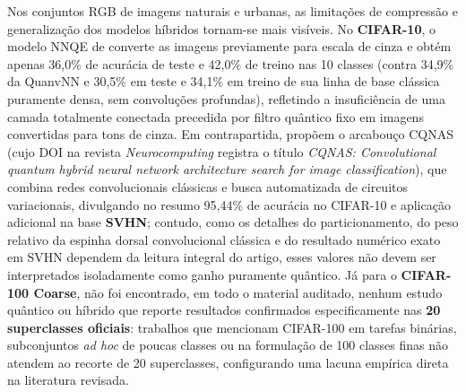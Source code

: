 \documentclass[
    12pt,
    openright,
    oneside,
    a4paper,
    english,
    brazil
]{abntex2}
\begin{document}
Nos conjuntos RGB de imagens naturais e urbanas, as limitações de compressão e generalização dos modelos híbridos tornam-se mais visíveis. No \textbf{CIFAR-10}, o modelo NNQE de  converte as imagens previamente para escala de cinza e obtém apenas 36,0\% de acurácia de teste e 42,0\% de treino nas 10 classes (contra 34,9\% da QuanvNN e 30,5\% em teste e 34,1\% em treino de sua linha de base clássica puramente densa, sem convoluções profundas), refletindo a insuficiência de uma camada totalmente conectada precedida por filtro quântico fixo em imagens convertidas para tons de cinza. Em contrapartida,  propõem o arcabouço CQNAS (cujo DOI na revista \textit{Neurocomputing} registra o título \textit{CQNAS: Convolutional quantum hybrid neural network architecture search for image classification}), que combina redes convolucionais clássicas e busca automatizada de circuitos variacionais, divulgando no resumo 95,44\% de acurácia no CIFAR-10 e aplicação adicional na base \textbf{SVHN}; contudo, como os detalhes do particionamento, do peso relativo da espinha dorsal convolucional clássica e do resultado numérico exato em SVHN dependem da leitura integral do artigo, esses valores não devem ser interpretados isoladamente como ganho puramente quântico. Já para o \textbf{CIFAR-100 Coarse}, não foi encontrado, em todo o material auditado, nenhum estudo quântico ou híbrido que reporte resultados confirmados especificamente nas \textbf{20 superclasses oficiais}: trabalhos que mencionam CIFAR-100 em tarefas binárias, subconjuntos \textit{ad hoc} de poucas classes ou na formulação de 100 classes finas não atendem ao recorte de 20 superclasses, configurando uma lacuna empírica direta na literatura revisada.
\end{document}
